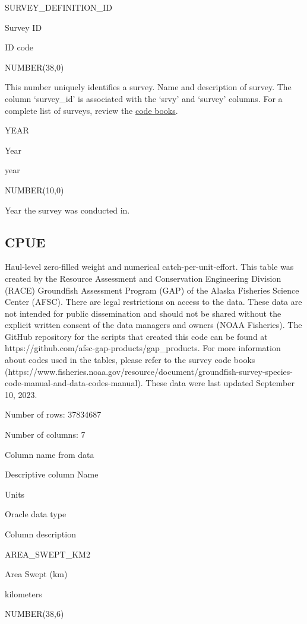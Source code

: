 \documentclass[
  letterpaper,
  oneside,
  open=any]{scrbook}
\begin{document}
SURVEY\_DEFINITION\_ID

Survey ID

ID code

NUMBER(38,0)

This number uniquely identifies a survey. Name and description of
survey. The column `survey\_id' is associated with the `srvy' and
`survey' columns. For a complete list of surveys, review the
\href{https://www.fisheries.noaa.gov/resource/document/groundfish-survey-species-code-manual-and-data-codes-manual}{code
books}.

YEAR

Year

year

NUMBER(10,0)

Year the survey was conducted in.

\hypertarget{cpue}{%
\subsection{CPUE}\label{cpue}}

Haul-level zero-filled weight and numerical catch-per-unit-effort. This
table was created by the Resource Assessment and Conservation
Engineering Division (RACE) Groundfish Assessment Program (GAP) of the
Alaska Fisheries Science Center (AFSC). There are legal restrictions on
access to the data. These data are not intended for public dissemination
and should not be shared without the explicit written consent of the
data managers and owners (NOAA Fisheries). The GitHub repository for the
scripts that created this code can be found at
https://github.com/afsc-gap-products/gap\_products. For more information
about codes used in the tables, please refer to the survey code books
(https://www.fisheries.noaa.gov/resource/document/groundfish-survey-species-code-manual-and-data-codes-manual).
These data were last updated September 10, 2023.

Number of rows: 37834687

Number of columns: 7

Column name from data

Descriptive column Name

Units

Oracle data type

Column description

AREA\_SWEPT\_KM2

Area Swept (km)

kilometers

NUMBER(38,6)
\end{document}

